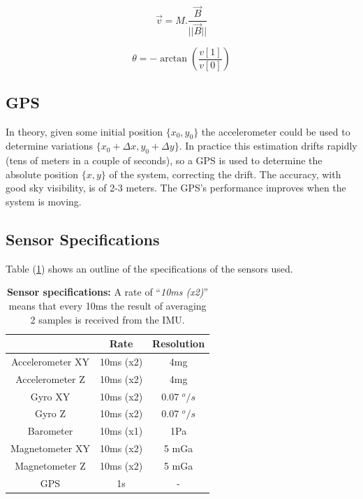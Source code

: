 \documentclass[conference]{IEEEtran}
\newcommand{\refp}[1]{(\ref{#1})}
\begin{document}
  \[
  \vec{v} = M . \frac{\vec{B}}{\vert \vert \vec{B} \vert \vert}
  \]

  \[
  \theta = -\arctan\left( \frac{v[1]}{v[0]}\right)
  \]



\subsection{GPS}
\label{sec:sensors-gps}

In theory, given some initial position $\{x_0 ,y_0\}$ the accelerometer could be used to determine variations $\{x_0+\Delta x,y_0+\Delta y\}$. In practice this estimation drifts rapidly (tens of meters in a couple of seconds), so a GPS is used to determine the absolute position $\{x,y\}$ of the system, correcting the drift. The accuracy, with good sky visibility, is of 2-3 meters. The GPS's performance improves when the system is moving.

\subsection{Sensor Specifications}
\label{sec:sensors-specifications}

Table \refp{tab:sensors:resumen} shows an outline of the specifications of the sensors used.

\begin{table}[h]
\begin{center}
\begin{tabular}{|c|c|c|}
\hline
 & Rate & Resolution \\
\hline
Accelerometer XY & 10ms (x2)& 4mg\\
\hline
Accelerometer Z  & 10ms (x2)& 4mg\\
\hline
Gyro XY  & 10ms (x2)& 0.07 $^o/s$\\
\hline
Gyro Z  & 10ms (x2)& 0.07 $^o/s$\\
\hline
Barometer  & 10ms (x1) & 1Pa\\
\hline
Magnetometer XY  & 10ms  (x2)& 5 mGa\\
\hline
Magnetometer Z  & 10ms (x2)& 5 mGa\\
\hline
GPS  & 1s & - \\
\hline
\end{tabular}
\end{center}
\caption{\textbf{Sensor specifications:} A rate of ``\textit{10ms (x2)}'' means that every 10ms the result of averaging 2 samples is received from the IMU.}
\label{tab:sensors:resumen}
\end{table}
\end{document}
